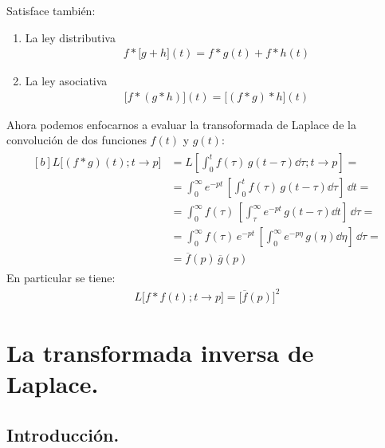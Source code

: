 Satisface también:
\begin{enumerate}
\item La ley distributiva
\begin{align}
f * \big[g + h\big](t) = f * g(t) + f * h(t)
\label{eq:ecuacion_03_57}
\end{align}
\item La ley asociativa
\begin{align}
\big[f * (g * h)\big](t) = \big[(f * g) * h\big](t)
\label{eq:ecuacion_03_58}
\end{align}
\end{enumerate}
Ahora podemos enfocarnos a evaluar la transoformada de Laplace de la convolución de dos funciones $f(t)$ y $g(t)$:
\begin{align}
\begin{aligned}[b]
L \big[(f * g)(t); t \to p\big] &= L \left[ \int_{0}^{t} f(\tau) \, g(t - \tau) \dd{\tau}; t \to p \right] = \\[0.5em]
&= \int_{0}^{\infty} e^{-p t} \, \left[ \int_{0}^{t} f(\tau) \, g(t - \tau) \dd{\tau}\right] \, \dd{t} = \\[0.5em]
&= \int_{0}^{\infty} f(\tau) \, \left[ \int_{\tau}^{\infty} e^{-p t} \, g(t - \tau) \dd{t}\right] \, \dd{\tau} = \\[0.5em]
&= \int_{0}^{\infty} f(\tau) \, e^{- p t} \, \left[ \int_{0}^{\infty} e^{-p \eta} \, g(\eta) \dd{\eta} \right] \, \dd{\tau} = \\[0.5em]
&= \overline{f}(p) \, \overline{g}(p)
\end{aligned}
\label{eq:ecuacion_03_59}
\end{align}
En particular se tiene:
\begin{align*}
L \big[f * f(t); t \to p\big] = \big[\overline{f}(p)\big]^{2}
\end{align*}

\section{La transformada inversa de Laplace.}

\subsection{Introducción.}

